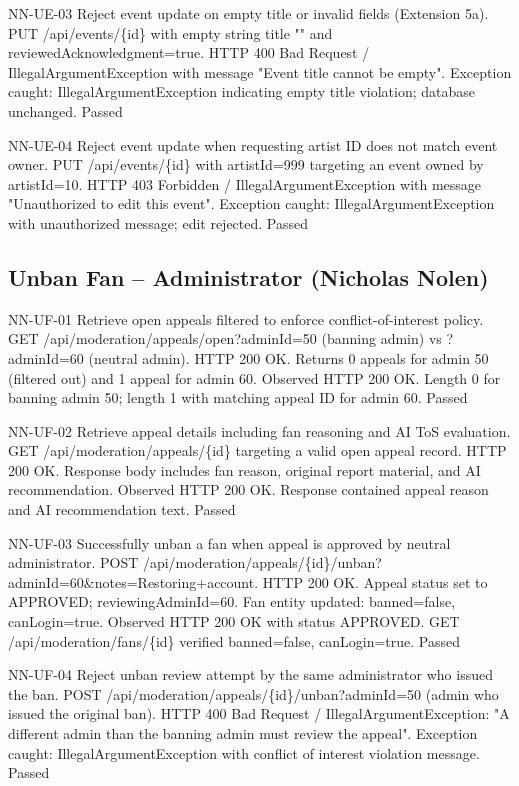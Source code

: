 \documentclass[11pt]{report}
\begin{document}
\clearpage
\nicktestcase
{NN-UE-03}
{Reject event update on empty title or invalid fields (Extension 5a).}
{PUT /api/events/\{id\} with empty string title "" and reviewedAcknowledgment=true.}
{HTTP 400 Bad Request / IllegalArgumentException with message "Event title cannot be empty".}
{Exception caught: IllegalArgumentException indicating empty title violation; database unchanged.}
{Passed}

\nicktestcase
{NN-UE-04}
{Reject event update when requesting artist ID does not match event owner.}
{PUT /api/events/\{id\} with artistId=999 targeting an event owned by artistId=10.}
{HTTP 403 Forbidden / IllegalArgumentException with message "Unauthorized to edit this event".}
{Exception caught: IllegalArgumentException with unauthorized message; edit rejected.}
{Passed}

\clearpage
\subsection*{Unban Fan -- Administrator (Nicholas Nolen)}
\nicktestcase
{NN-UF-01}
{Retrieve open appeals filtered to enforce conflict-of-interest policy.}
{GET /api/moderation/appeals/open?adminId=50 (banning admin) vs ?adminId=60 (neutral admin).}
{HTTP 200 OK. Returns 0 appeals for admin 50 (filtered out) and 1 appeal for admin 60.}
{Observed HTTP 200 OK. Length 0 for banning admin 50; length 1 with matching appeal ID for admin 60.}
{Passed}

\nicktestcase
{NN-UF-02}
{Retrieve appeal details including fan reasoning and AI ToS evaluation.}
{GET /api/moderation/appeals/\{id\} targeting a valid open appeal record.}
{HTTP 200 OK. Response body includes fan reason, original report material, and AI recommendation.}
{Observed HTTP 200 OK. Response contained appeal reason and AI recommendation text.}
{Passed}

\clearpage
\nicktestcase
{NN-UF-03}
{Successfully unban a fan when appeal is approved by neutral administrator.}
{POST /api/moderation/appeals/\{id\}/unban?adminId=60\&notes=Restoring+account.}
{HTTP 200 OK. Appeal status set to APPROVED; reviewingAdminId=60. Fan entity updated: banned=false, canLogin=true.}
{Observed HTTP 200 OK with status APPROVED. GET /api/moderation/fans/\{id\} verified banned=false, canLogin=true.}
{Passed}

\nicktestcase
{NN-UF-04}
{Reject unban review attempt by the same administrator who issued the ban.}
{POST /api/moderation/appeals/\{id\}/unban?adminId=50 (admin who issued the original ban).}
{HTTP 400 Bad Request / IllegalArgumentException: "A different admin than the banning admin must review the appeal".}
{Exception caught: IllegalArgumentException with conflict of interest violation message.}
{Passed}
\end{document}

